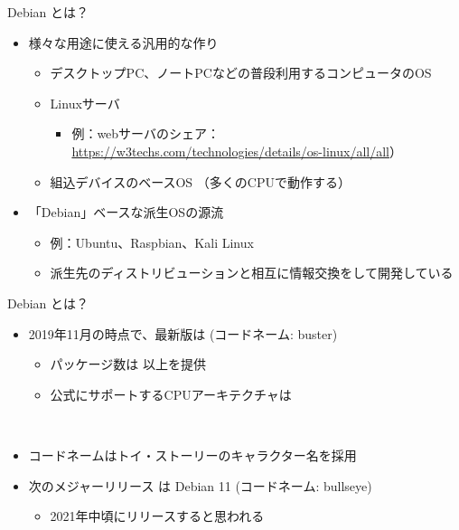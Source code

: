 \begin{frame}{Debian とは？}

\begin{itemize}
\item 様々な用途に使える汎用的な作り
  \begin{itemize}
  \item デスクトップPC、ノートPCなどの普段利用するコンピュータのOS
  \item Linuxサーバ
    \begin{itemize}
    \item 例：webサーバのシェア：\url{https://w3techs.com/technologies/details/os-linux/all/all}）
    \end{itemize}
  \item 組込デバイスのベースOS （多くのCPUで動作する）
  \end{itemize}
\item 「Debian」ベースな派生OSの源流
  \begin{itemize}
  \item 例：Ubuntu、Raspbian、Kali Linux
  \item 派生先のディストリビューションと相互に情報交換をして開発している
  \end{itemize}
\end{itemize}

\end{frame}


\begin{frame}{Debian とは？}

  \begin{itemize}
  \item 2019年11月の時点で、最新版は {\color{red}{Debian 10.2}} (コードネーム: buster)
    \begin{itemize}
    \item パッケージ数は {\color{red}{約57,000}} 以上を提供
    \item 公式にサポートするCPUアーキテクチャは {\color{red}{10}}
    \end{itemize}\
  \item コードネームはトイ・ストーリーのキャラクター名を採用
  \item 次のメジャーリリース は Debian 11 (コードネーム: {\color{red}{}}bullseye)
    \begin{itemize}
    \item 2021年中頃にリリースすると思われる
    \end{itemize}
\end{itemize}

\end{frame}


